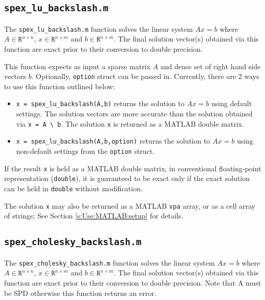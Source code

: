 \documentclass[12pt,oneside]{book}
\theoremstyle{definition}
\begin{document}
\subsection{\texttt{spex\_lu\_backslash.m}}
The \verb|spex_lu_backslash.m| function solves the linear system $A x = b$ where
$A \in \mathtt{R}^{n \times n}$, $x \in \mathtt{R}^{n \times m}$ and $b \in
\mathtt{R}^{n \times m}$. The final solution vector(s) obtained via this
function are exact prior to their conversion to double precision.

This function expects as input a sparse matrix $A$ and dense set of
right hand side vectors $b$. Optionally, \verb|option| struct can be passed in.
Currently, there are 2 ways to use this function outlined below:

\begin{itemize}

\item \verb|x = spex_lu_backslash(A,b)| returns the solution to $A x =
b$ using default settings. The solution vectors are more accurate than
the solution obtained via \verb|x = A \ b|.  The solution \verb|x| is
returned as a MATLAB double matrix.

\item \verb|x = spex_lu_backslash(A,b,option)| returns the solution to $A x =
b$ using non-default settings from the \verb|option| struct.

\end{itemize}

If the result \verb|x| is held as a MATLAB double matrix, in conventional
floating-point representation (\verb|double|), it is guaranteed to be exact
only if the exact solution can be held in \verb|double| without modification.

The solution \verb|x| may also be returned as a MATLAB \verb|vpa| array, or as
a cell array of strings; See Section \ref{s:Use:MATLAB:setup} for details.


\subsection{\texttt{spex\_cholesky\_backslash.m}}
The \verb|spex_cholesky_backslash.m| function solves the linear system $A x = b$ where
$A \in \mathtt{R}^{n \times n}$, $x \in \mathtt{R}^{n \times m}$ and $b \in
\mathtt{R}^{n \times m}$. The final solution vector(s) obtained via this
function are exact prior to their conversion to double precision. Note that
A must be SPD otherwise this function returns an error.
\end{document}
